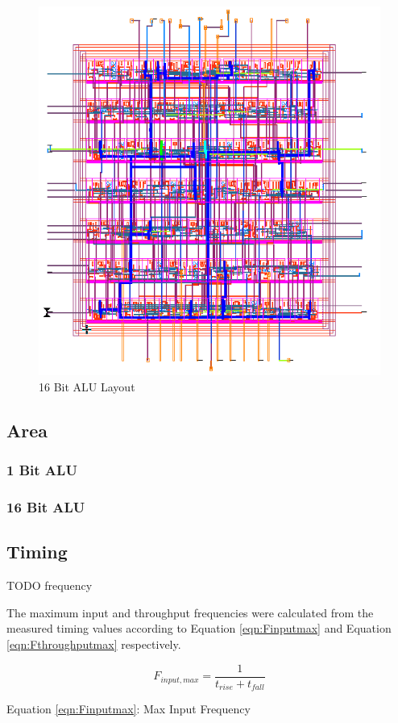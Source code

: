 \documentclass[11pt]{article}
\begin{document}
			\begin{figure}[H]
				\centering
				\includegraphics[width=0.7\linewidth]{"Pictures/ALU-16Bit Layout"}
				\caption{16 Bit ALU Layout}
				\label{fig:alu-16bit-layout}
			\end{figure}
	
	\subsection{Area}
	
		\subsubsection{1 Bit ALU}
	
		\subsubsection{16 Bit ALU}
	
	\subsection{Timing}
	
		TODO frequency
		
		The maximum input and throughput frequencies were calculated from the measured timing values according to Equation \ref{eqn:Finputmax} and Equation \ref{eqn:Fthroughputmax} respectively. 
		
		\begin{equation}\label{eqn:Finputmax}
		F_{input,max} = \frac{1}{t_{rise}+t_{fall}}
		\end{equation}
		\begin{center}
			Equation \ref{eqn:Finputmax}: Max Input Frequency
		\end{center}
		
\end{document}
